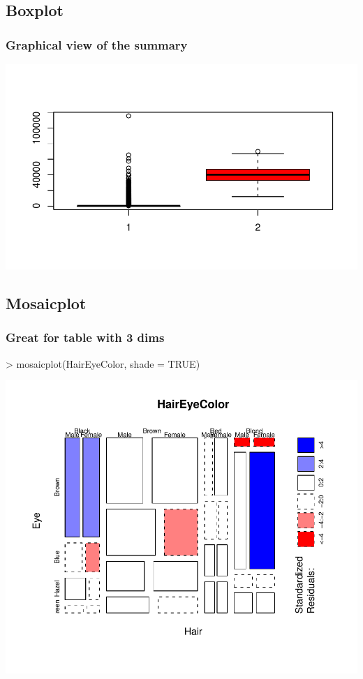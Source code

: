 \subsection{Boxplot}

\begin{frame}
  \frametitle{Graphical view of the summary}
\begin{Schunk}
\end{Schunk}
\includegraphics{plots/fig-029}
\end{frame}


\subsection{Mosaicplot}

\begin{frame}
  \frametitle{Great for table with 3 dims}
\begin{Schunk}
\begin{Sinput}
> mosaicplot(HairEyeColor, shade = TRUE)
\end{Sinput}
\end{Schunk}
\includegraphics{plots/fig-030}
\end{frame}

